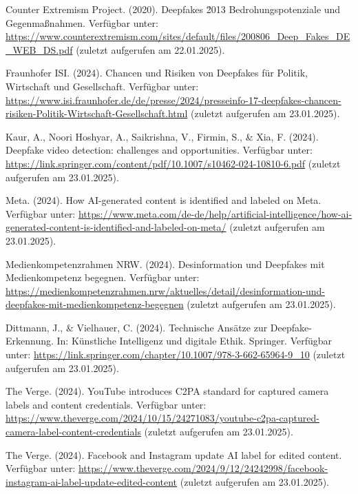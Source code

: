 \documentclass[a4paper,12pt]{article}
\begin{document}
\begin{thebibliography}{99}
     Counter Extremism Project. (2020). Deepfakes \u2013 Bedrohungspotenziale und Gegenmaßnahmen.
    Verfügbar unter: \url{https://www.counterextremism.com/sites/default/files/200806_Deep_Fakes_DE_WEB_DS.pdf} (zuletzt aufgerufen am 22.01.2025).
    
     Fraunhofer ISI. (2024). Chancen und Risiken von Deepfakes für Politik, Wirtschaft und Gesellschaft. 
    Verfügbar unter: \url{https://www.isi.fraunhofer.de/de/presse/2024/presseinfo-17-deepfakes-chancen-risiken-Politik-Wirtschaft-Gesellschaft.html} (zuletzt aufgerufen am 23.01.2025). 
    
     Kaur, A., Noori Hoshyar, A., Saikrishna, V., Firmin, S., \& Xia, F. (2024). Deepfake video detection: challenges and opportunities. 
    Verfügbar unter: \url{https://link.springer.com/content/pdf/10.1007/s10462-024-10810-6.pdf} (zuletzt aufgerufen am 23.01.2025).
    
     Meta. (2024). How AI-generated content is identified and labeled on Meta. 
    Verfügbar unter: \url{https://www.meta.com/de-de/help/artificial-intelligence/how-ai-generated-content-is-identified-and-labeled-on-meta/} (zuletzt aufgerufen am 23.01.2025).
    
     Medienkompetenzrahmen NRW. (2024). Desinformation und Deepfakes mit Medienkompetenz begegnen. 
    Verfügbar unter: \url{https://medienkompetenzrahmen.nrw/aktuelles/detail/desinformation-und-deepfakes-mit-medienkompetenz-begegnen} (zuletzt aufgerufen am 23.01.2025).
    
     Dittmann, J., \& Vielhauer, C. (2024). Technische Ansätze zur Deepfake-Erkennung. In: Künstliche Intelligenz und digitale Ethik. Springer. 
    Verfügbar unter: \url{https://link.springer.com/chapter/10.1007/978-3-662-65964-9_10} (zuletzt aufgerufen am 23.01.2025).
    
     The Verge. (2024). YouTube introduces C2PA standard for captured camera labels and content credentials. 
    Verfügbar unter: \url{https://www.theverge.com/2024/10/15/24271083/youtube-c2pa-captured-camera-label-content-credentials} (zuletzt aufgerufen am 23.01.2025).
    
     The Verge. (2024). Facebook and Instagram update AI label for edited content. 
    Verfügbar unter: \url{https://www.theverge.com/2024/9/12/24242998/facebook-instagram-ai-label-update-edited-content} (zuletzt aufgerufen am 23.01.2025).
    

\end{thebibliography}
\end{document}
